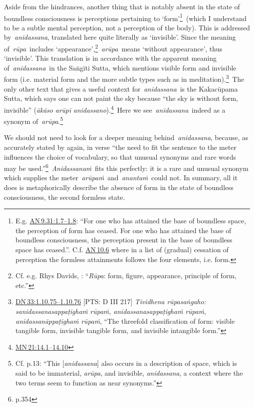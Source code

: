 \documentclass[10pt, openany]{book}
\begin{document}
Aside from the hindrances, another thing that is notably absent in the state of boundless consciousness is perceptions pertaining to ‘form’\footnote {E.g. \href{https://suttacentral.net/an9.31/en/sujato\#1.7}{AN 9.31:1.7–1.8}: “For one who has attained the base of boundless space, the perception of form has ceased. For one who has attained the base of boundless consciousness, the perception present in the base of boundless space has ceased.”. C.f. \href{https://suttacentral.net/an10.6/en/sujato}{AN 10.6} where in a list of (gradual) cessation of perception the formless attainments follows the four elements, i.e. form.} (which I understand to be a subtle mental perception, not a perception of the body). This is addressed by \textit{anidassana}, translated here quite literally as ‘invisible’. Since the meaning of \textit{rūpa} includes ‘appearance’,\footnote {Cf. e.g. Rhys Davids, \cite{PED}: “\textit{Rūpa}: form, figure, appearance, principle of form, etc.”} \textit{arūpa} means ‘without appearance’, thus ‘invisible’. This translation is in accordance with the apparent meaning of \textit{anidassana} in the Saṅgīti Sutta, which mentions visible form and invisible form (i.e. material form and the more subtle types such as in meditation).\footnote {\href{https://suttacentral.net/dn33/en/sujato\#1.10.75}{DN 33:1.10.75–1.10.76} [PTS: D III 217] \textit{Tividhena rūpasaṅgaho: sanidassanasappaṭighaṁ rūpaṁ, anidassanasappaṭighaṁ rūpaṁ, anidassanāppaṭighaṁ rūpaṁ}, “The threefold classification of form: visible tangible form, invisible tangible form, and invisible intangible form.”} The only other text that gives a useful context for \textit{anidassana} is the Kakacūpama Sutta, which says one can not paint the sky because “the sky is without form, invisible” (\textit{ākāso arūpī anidassano}).\footnote {\href{https://suttacentral.net/mn21/en/sujato\#14.1}{MN 21:14.1–14.10}} Here we see \textit{anidassana} indeed as a synonym of \textit{arūpa}.\footnote {Cf. \cite{Anālayo 2017} p.13: “This [\textit{anidassana}] also occurs in a description of space, which is said to be immaterial, \textit{arūpa}, and invisible, \textit{anidassana}, a context where the two terms seem to function as near synonyms.”}


We should not need to look for a deeper meaning behind \textit{anidassana}, because, as accurately stated by \cite{Warder} again, in verse “the need to fit the sentence to the meter influences the choice of vocabulary, so that unusual synonyms and rare words may be used.”\footnote {\cite{Warder} p.354} \textit{Anidassanaṁ} fits this perfectly: it is a rare and unusual synonym which supplies the meter \textit{arūpaṁ} and \textit{anantaṁ} could not. In summary, all it does is metaphorically describe the absence of form in the state of boundless consciousness, the second formless state.
\end{document}
